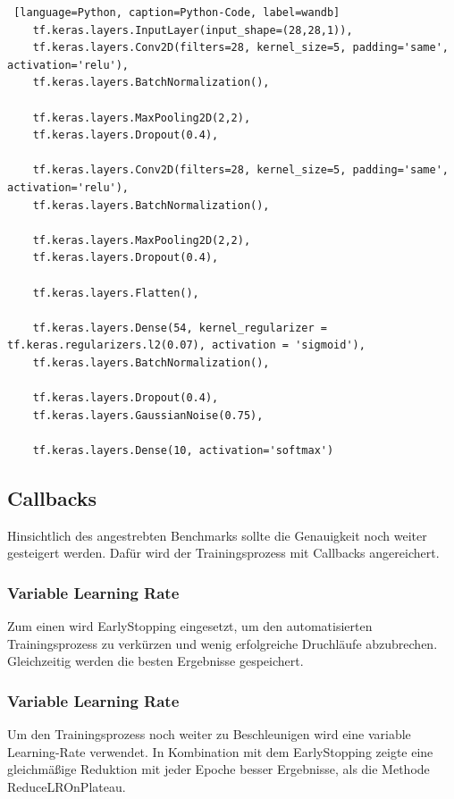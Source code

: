 \documentclass[
fontsize=12pt,					%
paper=a4,						%
twoside=true, 					%
listof=totoc, 					%
bibliography=totoc,				%
titlepage, 						%
headsepline, 					%
DIV=12,							%
BCOR=6mm,						%
cleardoublepage=empty,			%
parskip,							%
ngerman
]{scrartcl}
\begin{document}
\begin{lstlisting} [language=Python, caption=Python-Code, label=wandb]
	tf.keras.layers.InputLayer(input_shape=(28,28,1)),
	tf.keras.layers.Conv2D(filters=28, kernel_size=5, padding='same', activation='relu'),
	tf.keras.layers.BatchNormalization(),
	
	tf.keras.layers.MaxPooling2D(2,2),
	tf.keras.layers.Dropout(0.4),
	
	tf.keras.layers.Conv2D(filters=28, kernel_size=5, padding='same', activation='relu'),
	tf.keras.layers.BatchNormalization(),
	
	tf.keras.layers.MaxPooling2D(2,2),
	tf.keras.layers.Dropout(0.4),
	
	tf.keras.layers.Flatten(),
	
	tf.keras.layers.Dense(54, kernel_regularizer = tf.keras.regularizers.l2(0.07), activation = 'sigmoid'),
	tf.keras.layers.BatchNormalization(),
	
	tf.keras.layers.Dropout(0.4),
	tf.keras.layers.GaussianNoise(0.75),
	
	tf.keras.layers.Dense(10, activation='softmax')
\end{lstlisting}

\subsection{Callbacks}

Hinsichtlich des angestrebten Benchmarks sollte die Genauigkeit noch weiter gesteigert werden. Dafür wird der Trainingsprozess mit Callbacks angereichert.

\subsubsection{Variable Learning Rate}

Zum einen wird EarlyStopping eingesetzt, um den automatisierten Trainingsprozess zu verkürzen und wenig erfolgreiche Druchläufe abzubrechen. Gleichzeitig werden die besten Ergebnisse gespeichert. 


\subsubsection{Variable Learning Rate}

Um den Trainingsprozess noch weiter zu Beschleunigen wird eine variable Learning-Rate verwendet. In Kombination mit dem EarlyStopping zeigte eine gleichmäßige Reduktion mit jeder Epoche besser Ergebnisse, als die Methode ReduceLROnPlateau.
\end{document}
